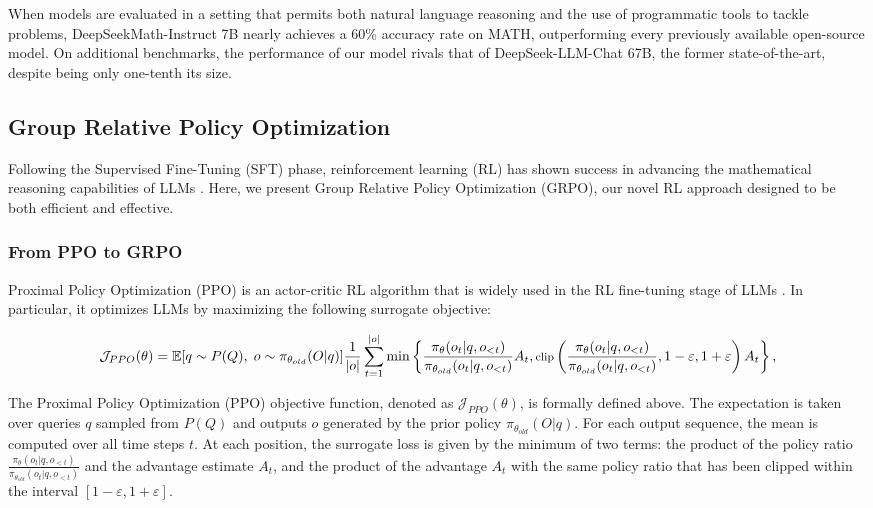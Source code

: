\begin{itemize}[topsep=0pt]
\begin{itemize}[topsep=0pt]
When models are evaluated in a setting that permits both natural language reasoning and the use of programmatic tools to tackle problems, DeepSeekMath-Instruct 7B nearly achieves a 60\% accuracy rate on MATH, outperforming every previously available open-source model. On additional benchmarks, the performance of our model rivals that of DeepSeek-LLM-Chat 67B, the former state-of-the-art, despite being only one-tenth its size.

\subsection{Group Relative Policy Optimization} Following the Supervised Fine-Tuning (SFT) phase, reinforcement learning (RL) has shown success in advancing the mathematical reasoning capabilities of LLMs \citep{wang2023math,wizardmath}. Here, we present Group Relative Policy Optimization (GRPO), our novel RL approach designed to be both efficient and effective.

\subsubsection{From PPO to GRPO} Proximal Policy Optimization (PPO) \citep{schulman2017proximal} is an actor-critic RL algorithm that is widely used in the RL fine-tuning stage of LLMs \citep{ouyang2022training}. In particular, it optimizes LLMs by maximizing the following surrogate objective:

\begin{equation}
\footnotesize
    \mathcal{J}_{PPO}(\theta) = \mathbb{E}{[q \sim P(Q),\ o \sim \pi_{\theta_{old}}(O|q)]} \frac{1}{|o|} \sum_{t=1}^{|o|} \min \left\{ \frac{\pi_\theta(o_{t} | q, o_{<t})}{\pi_{\theta_{old}}(o_{t} | q, o_{<t})} A_{t}, \text{clip} \left( \frac{\pi_\theta(o_{t} | q, o_{<t})}{\pi_{\theta_{old}}(o_{t} | q, o_{<t})}, 1 - \varepsilon, 1 + \varepsilon \right)  A_{t} \right\} ,
\end{equation}

The Proximal Policy Optimization (PPO) objective function, denoted as $\mathcal{J}_{PPO}(\theta)$, is formally defined above. The expectation is taken over queries $q$ sampled from $P(Q)$ and outputs $o$ generated by the prior policy $\pi_{\theta_{old}}(O|q)$. For each output sequence, the mean is computed over all time steps $t$. At each position, the surrogate loss is given by the minimum of two terms: the product of the policy ratio $\frac{\pi_\theta(o_{t} | q, o_{<t})}{\pi_{\theta_{old}}(o_{t} | q, o_{<t})}$ and the advantage estimate $A_{t}$, and the product of the advantage $A_{t}$ with the same policy ratio that has been clipped within the interval $[1-\varepsilon, 1+\varepsilon]$.


\end{itemize}
\end{itemize}
